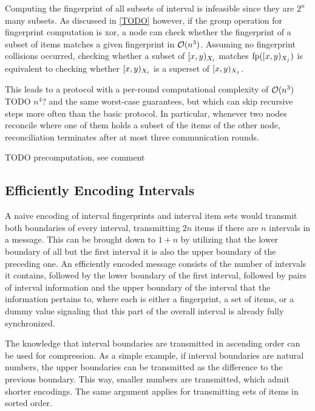 Computing the fingerprint of all subsets of interval is infeasible since they are $2^n$ many subsets. As discussed in \cref{TODO} however, if the group operation for fingerprint computation is xor, a node can check whether the fingerprint of a subset of items matches a given fingerprint in $\mathcal{O}(n^3)$.
Assuming no fingerprint collisions occurred, checking whether a subset of $[{x},{y})_{X_i}$ matches $\operatorname{fp}([{x},{y})_{X_j})$ is equivalent to checking whether $[{x},{y})_{X_i}$ is a superset of $[{x},{y})_{X_j}$.

This leads to a protocol with a per-round computational complexity of $\mathcal{O}(n^3)$ TODO $n^4$? and the same worst-case guarantees, but which can skip recursive steps more often than the basic protocol. In particular, whenever two nodes reconcile where one of them holds a subset of the items of the other node, reconciliation terminates after at most three communication rounds.

TODO precomputation, see comment %

\subsection{Efficiently Encoding Intervals}

A naive encoding of interval fingerprints and interval item sets would transmit both boundaries of every interval, transmitting $2n$ items if there are $n$ intervals in a message. This can be brought down to $1 + n$ by utilizing that the lower boundary of all but the first interval it is also the upper boundary of the preceding one. An efficiently encoded message consists of the number of intervals it contains, followed by the lower boundary of the first interval, followed by pairs of interval information and the upper boundary of the interval that the information pertains to, where each  is either a fingerprint, a set of items, or a dummy value signaling that this part of the overall interval is already fully synchronized.

The knowledge that interval boundaries are transmitted in ascending order can be used for compression. As a simple example, if interval boundaries are natural numbers, the upper boundaries can be transmitted as the difference to the previous boundary. This way, smaller numbers are transmitted, which admit shorter encodings. The same argument applies for transmitting sets of items in sorted order.

